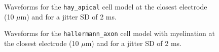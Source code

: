 \documentclass[final, a4paper,masters,en,listoffigures,listoftables,norwegiandates]{NMBU}
\begin{document}
\begin{figure}[htbp]
    \centering
    \caption{Waveforms for the \texttt{hay\_apical} cell model at the closest electrode (10 $\mu$m) and for a jitter SD of 2 ms.}
    \label{fig:apicalwav}
\end{figure}

\begin{figure}[htbp]
    \centering
    \caption{Waveforms for the \texttt{hallermann\_axon} cell model with myelination at the closest electrode (10 $\mu$m) and for a jitter SD of 2 ms.} 
    \label{fig:axonwavmyen}
\end{figure}
\end{document}
